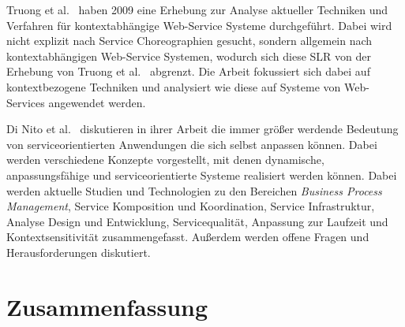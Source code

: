 \documentclass[conference,compsoc]{IEEEtran}
\begin{document}
Truong et al.~\cite{truong2009survey} haben 2009 eine Erhebung zur Analyse aktueller Techniken und Verfahren für kontextabhängige Web-Service Systeme durchgeführt. Dabei wird nicht explizit nach Service Choreographien gesucht, sondern allgemein nach kontextabhängigen Web-Service Systemen, wodurch sich diese SLR von der Erhebung von Truong et al.~\cite{truong2009survey} abgrenzt. Die Arbeit fokussiert sich dabei auf kontextbezogene Techniken und analysiert wie diese auf Systeme von Web-Services angewendet werden.

Di Nito et al.~\cite{di2008journey} diskutieren in ihrer Arbeit die immer größer werdende Bedeutung von serviceorientierten Anwendungen die sich selbst anpassen können. Dabei werden verschiedene Konzepte vorgestellt, mit denen dynamische, anpassungsfähige und serviceorientierte Systeme realisiert werden können. Dabei werden aktuelle Studien und Technologien zu den Bereichen \textit{Business Process Management}, Service Komposition und Koordination, Service Infrastruktur, Analyse Design und Entwicklung, Servicequalität, Anpassung zur Laufzeit und Kontextsensitivität zusammengefasst. Außerdem werden offene Fragen und Herausforderungen diskutiert.

\section{Zusammenfassung}



%
%






\end{document}
